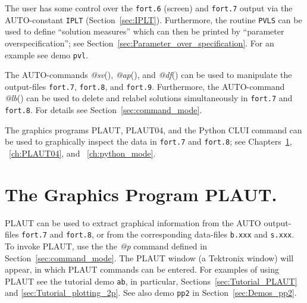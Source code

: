 \documentclass[12pt]{report}
\begin{document}
The user has some control over the {\tt fort.6} (screen) and {\tt fort.7} output 
via the {\cal AUTO}-constant {\tt IPLT} (Section~\ref{sec:IPLT}).
Furthermore, the routine {\tt PVLS} can be used to define ``solution measures''
which can then be printed by ``parameter overspecification'';
see Section~\ref{sec:Parameter_over_specification}.
For an example see demo {\tt pvl}.

The {\cal AUTO}-commands {\it @sv}(), {\it @ap}(),
 and {\it @df}() can be used 
to manipulate  the output-files {\tt fort.7}, {\tt fort.8},
and {\tt fort.9}.
Furthermore, the {\cal AUTO}-command {\it @lb}() can be
used to delete and
relabel solutions simultaneously in {\tt fort.7} and {\tt fort.8}.
For details see Section~\ref{sec:command_mode}.

The graphics programs {\cal PLAUT}, {\cal PLAUT04}, and the Python
CLUI command  can be used to graphically inspect 
the data in {\tt fort.7} and {\tt fort.8}; see Chapters~\ref{ch:PLAUT},
~\ref{ch:PLAUT04}, and ~\ref{ch:python_mode}.
 
\chapter{ The Graphics Program PLAUT.} \label{ch:PLAUT}
{\cal PLAUT} can be used to extract graphical
information from the {\cal AUTO} output-files {\tt fort.7} and {\tt fort.8},
or from the corresponding data-files {\tt b.xxx} and {\tt s.xxx}.
To invoke {\cal PLAUT}, use the the {\it @p} command defined in 
Section~\ref{sec:command_mode}.
The {\cal PLAUT} window (a Tektronix window) will appear, in which {\cal PLAUT}
commands can be entered.
For examples of using {\cal PLAUT} see the tutorial demo {\tt ab}, in particular,
Sections~\ref{sec:Tutorial_PLAUT} and \ref{sec:Tutorial_plotting_2p}.
See also demo {\tt pp2} in Section~\ref{sec:Demos_pp2}.
\end{document}

